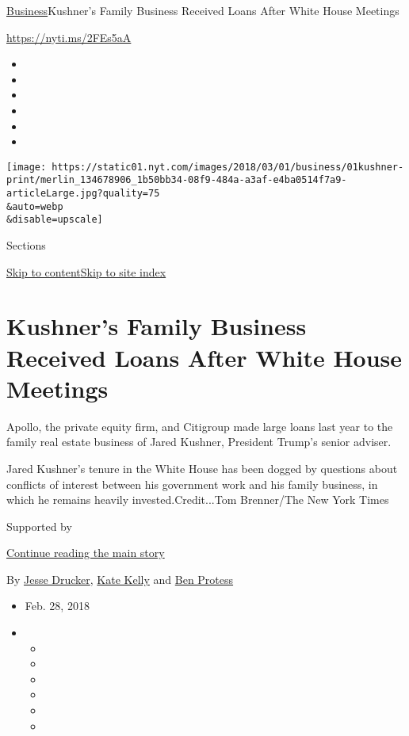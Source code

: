 \href{/section/business}{Business}\textbar{}Kushner's Family Business
Received Loans After White House Meetings

\url{https://nyti.ms/2FEs5aA}

\begin{itemize}
\item
\item
\item
\item
\item
\item
\end{itemize}

\texttt{[image: https://static01.nyt.com/images/2018/03/01/business/01kushner-print/merlin\_134678906\_1b50bb34-08f9-484a-a3af-e4ba0514f7a9-articleLarge.jpg?quality=75\\\&auto=webp\\\&disable=upscale]}

Sections

\protect\hyperlink{site-content}{Skip to
content}\protect\hyperlink{site-index}{Skip to site index}

\hypertarget{kushners-family-business-received-loans-after-white-house-meetings}{%
\section{Kushner's Family Business Received Loans After White House
Meetings}\label{kushners-family-business-received-loans-after-white-house-meetings}}

Apollo, the private equity firm, and Citigroup made large loans last
year to the family real estate business of Jared Kushner, President
Trump's senior adviser.

Jared Kushner's tenure in the White House has been dogged by questions
about conflicts of interest between his government work and his family
business, in which he remains heavily invested.Credit...Tom Brenner/The
New York Times

Supported by

\protect\hyperlink{after-sponsor}{Continue reading the main story}

By \href{https://www.nytimes.com/by/jesse-drucker}{Jesse Drucker},
\href{https://www.nytimes.com/by/kate-kelly}{Kate Kelly} and
\href{http://www.nytimes.com/by/ben-protess}{Ben Protess}

\begin{itemize}
\item
  Feb. 28, 2018
\item
  \begin{itemize}
  \item
  \item
  \item
  \item
  \item
  \item
  \end{itemize}
\end{itemize}

